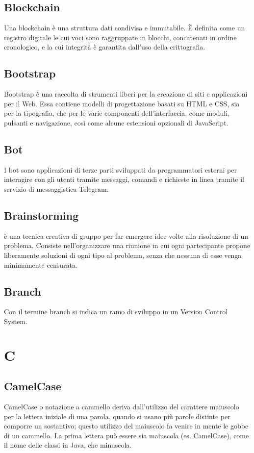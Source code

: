 \subsection{Blockchain}  Una blockchain è una struttura dati condivisa e immutabile. È definita come un registro digitale le cui voci sono raggruppate in blocchi, concatenati in ordine cronologico, e la cui integrità è garantita dall'uso della crittografia.
\subsection{Bootstrap}  Bootstrap è una raccolta di strumenti liberi per la creazione di siti e applicazioni per il Web. Essa contiene modelli di progettazione basati su HTML e CSS, sia per la tipografia, che per le varie componenti dell'interfaccia, come moduli, pulsanti e navigazione, così come alcune estensioni opzionali di JavaScript.
\subsection{Bot}  I bot sono applicazioni di terze parti sviluppati da programmatori esterni per interagire con gli utenti tramite messaggi, comandi e richieste in linea tramite il servizio di messaggistica Telegram.
\subsection{Brainstorming}  è una tecnica creativa di gruppo per far emergere idee volte alla risoluzione di un problema. Consiste nell'organizzare una riunione in cui ogni partecipante propone liberamente soluzioni di ogni tipo al problema, senza che nessuna di esse venga minimamente censurata.
\subsection{Branch}  Con il termine branch si indica un ramo di sviluppo in un Version Control System.

\newpage \section{C}
\subsection{CamelCase}  CamelCase o notazione a cammello deriva dall'utilizzo del carattere maiuscolo per la lettera iniziale di una parola, quando si usano più parole distinte per comporre un sostantivo; questo utilizzo del maiuscolo fa venire in mente le gobbe di un cammello. La prima lettera può essere sia maiuscola (es. CamelCase), come il nome delle classi in Java, che minuscola.
